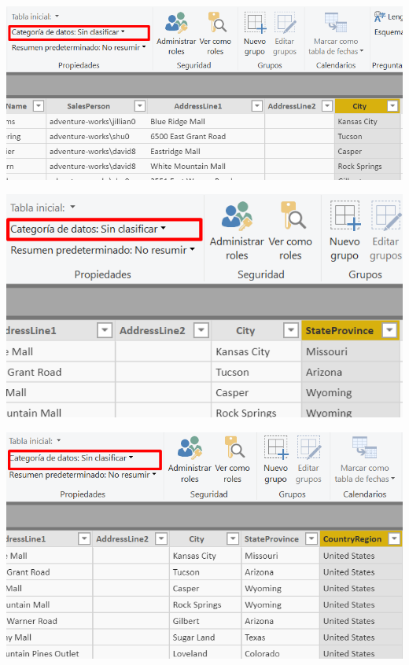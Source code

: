\begin{itemize}
\begin{enumerate}
\begin{center}
\includegraphics[scale=0.55]{./Imagenes/21.png}
\end{center}

\begin{center}
\includegraphics[scale=0.55]{./Imagenes/22.png}
\end{center}

\begin{center}
\includegraphics[scale=0.55]{./Imagenes/23.png}
\end{center}


\end{enumerate}
\end{itemize}
